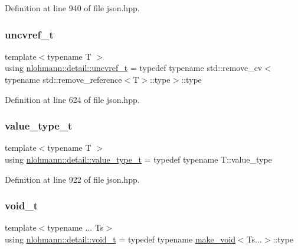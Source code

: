 Definition at line 940 of file json.\+hpp.

\mbox{\label{namespacenlohmann_1_1detail_a53a082eedad9f4729fcd8fed552a21f7}} 
\subsubsection{\texorpdfstring{uncvref\_t}{uncvref\_t}}
{\footnotesize\ttfamily template$<$typename T $>$ \\
using \mbox{\hyperlink{namespacenlohmann_1_1detail_a53a082eedad9f4729fcd8fed552a21f7}{nlohmann\+::detail\+::uncvref\+\_\+t}} = typedef typename std\+::remove\+\_\+cv$<$typename std\+::remove\+\_\+reference$<$T$>$\+::type$>$\+::type}



Definition at line 624 of file json.\+hpp.

\mbox{\label{namespacenlohmann_1_1detail_af91beae90c2fb0f931079b3d50a343bc}} 
\subsubsection{\texorpdfstring{value\_type\_t}{value\_type\_t}}
{\footnotesize\ttfamily template$<$typename T $>$ \\
using \mbox{\hyperlink{namespacenlohmann_1_1detail_af91beae90c2fb0f931079b3d50a343bc}{nlohmann\+::detail\+::value\+\_\+type\+\_\+t}} = typedef typename T\+::value\+\_\+type}



Definition at line 922 of file json.\+hpp.

\mbox{\label{namespacenlohmann_1_1detail_a92a167c49c6697b6ffe4f79492c705e5}} 
\subsubsection{\texorpdfstring{void\_t}{void\_t}}
{\footnotesize\ttfamily template$<$typename ... Ts$>$ \\
using \mbox{\hyperlink{namespacenlohmann_1_1detail_a92a167c49c6697b6ffe4f79492c705e5}{nlohmann\+::detail\+::void\+\_\+t}} = typedef typename \mbox{\hyperlink{structnlohmann_1_1detail_1_1make__void}{make\+\_\+void}}$<$Ts...$>$\+::type}



